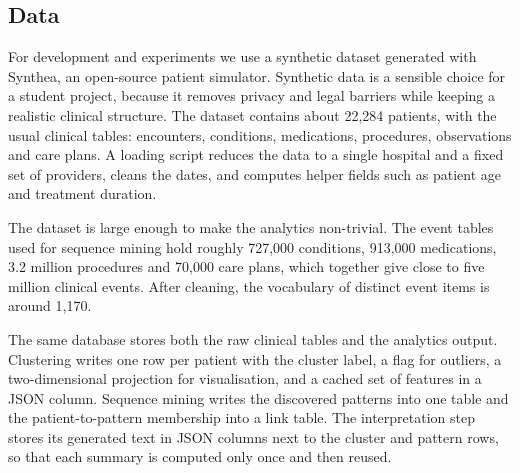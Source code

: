 \subsection{Data}

For development and experiments we use a synthetic dataset generated with Synthea, an open-source patient simulator. Synthetic data is a sensible choice for a student project, because it removes privacy and legal barriers while keeping a realistic clinical structure. The dataset contains about 22{,}284 patients, with the usual clinical tables: encounters, conditions, medications, procedures, observations and care plans. A loading script reduces the data to a single hospital and a fixed set of providers, cleans the dates, and computes helper fields such as patient age and treatment duration.

The dataset is large enough to make the analytics non-trivial. The event tables used for sequence mining hold roughly 727{,}000 conditions, 913{,}000 medications, 3.2 million procedures and 70{,}000 care plans, which together give close to five million clinical events. After cleaning, the vocabulary of distinct event items is around 1{,}170.

The same database stores both the raw clinical tables and the analytics output. Clustering writes one row per patient with the cluster label, a flag for outliers, a two-dimensional projection for visualisation, and a cached set of features in a JSON column. Sequence mining writes the discovered patterns into one table and the patient-to-pattern membership into a link table. The interpretation step stores its generated text in JSON columns next to the cluster and pattern rows, so that each summary is computed only once and then reused.
